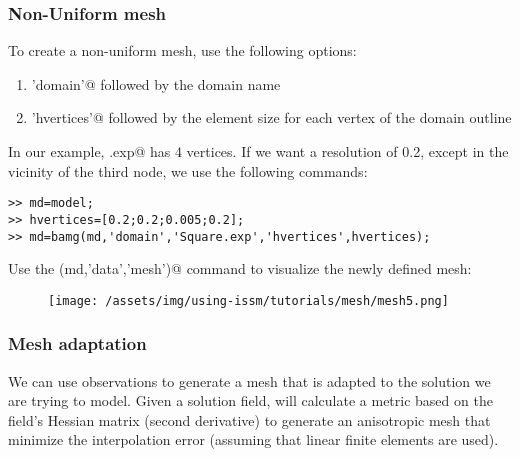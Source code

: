 \subsubsection{Non-Uniform mesh}%
To create a non-uniform mesh, use the following options:
\begin{enumerate}
	\item \verb@'domain'@ followed by the domain name
	\item \verb@'hvertices'@ followed by the element size for each vertex of the domain outline
\end{enumerate}
In our example, \verb@Square.exp@ has 4 vertices. If we want a resolution of 0.2, except in the vicinity of the third node, we use the following commands:
\begin{verbatim}>> md=model;
>> hvertices=[0.2;0.2;0.005;0.2];
>> md=bamg(md,'domain','Square.exp','hvertices',hvertices);
\end{verbatim}
Use the \verb@plotmodel(md,'data','mesh')@ command to visualize the newly defined mesh:
\begin{figure}[H]
	\begin{center}
		\texttt{[image: /assets/img/using-issm/tutorials/mesh/mesh5.png]}
	\end{center}
\end{figure}
\subsubsection{Mesh adaptation}%
We can use observations to generate a mesh that is adapted to the solution we are trying to model. Given a solution field, \verb@bamg@ will calculate a metric based on the field's Hessian matrix (second derivative) to generate an anisotropic mesh that minimize the interpolation error (assuming that linear finite elements are used).

